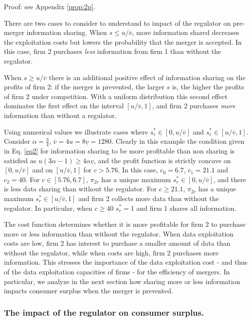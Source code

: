 \documentclass[a4paper,leqno]{article}%
\renewcommand{\a}{\alpha}
\newcommand{\uv}{\underline{v}}
\newcommand{\ov}{\overline{v}}
\begin{document}
\noindent Proof: see Appendix \ref{prop:2p}.


\noindent There are two cases to consider to understand to impact of the regulator on pre-merger information sharing. When $s\leq u/ \ov$, more information shared decreases the exploitation costs but lowers the probability that the merger is accepted. In this case, firm 2 purchases \textit{less} information from firm 1 than without the regulator. 

\medskip

When $s\geq u/ \ov$ there is an additional positive effect of information sharing on the profits of firm 2: if the merger is prevented, the larger $s$ is, the higher the profits of firm 2 under competition. With a uniform distribution this second effect dominates the first effect on the interval $[u/\ov,1]$, and firm 2 purchases \textit{more} information than without a regulator. 

\medskip

Using numerical values we illustrate cases where $s_r^*\in[0,u/\ov]$ and $s_r^*\in[u/\ov,1]$. Consider $\a=\frac{3}{4}$, $\ov=4u=8\uv=1280$. Clearly in this example the condition given in Eq. \ref{eq2} for information sharing to be more profitable than non sharing is satisfied as $u(3\a-1)\geq 4\a\uv$, and the profit function is strictly concave on $[0,u/\ov]$ and on $[u/\ov,1]$ for $c>5.76$. In this case, $c_0=6.7$, $c_1=21.1$ and $c_2=40$. For $c\in[5.76,6.7]$, $\pi_{2r}$ has a unique maximum $s_r^*\in[0,u/\ov]$, and there is less data sharing than without the regulator. For $c\geq21.1$, $\pi_{2r}$ has a unique maximum $s_r^*\in[u/\ov,1]$ and firm 2 collects more data than without the regulator. In particular, when $c\geq 40$ $s^*_r=1$ and firm 1 shares all information. 

\medskip

The cost function determines whether it is more profitable for firm 2 to purchase more or less information than without the regulator. When data exploitation costs are low, firm 2 has interest to purchase a smaller amount of data than without the regulator, while when costs are high, firm 2 purchases more information. This stresses the importance of the data exploitation cost - and thus of the data exploitation capacities of firms - for the efficiency of mergers. In particular, we analyze in the next section how sharing more or less information impacts consumer surplus when the merger is prevented.

\medskip

\subsubsection{The impact of the regulator on consumer surplus.}
\end{document}
